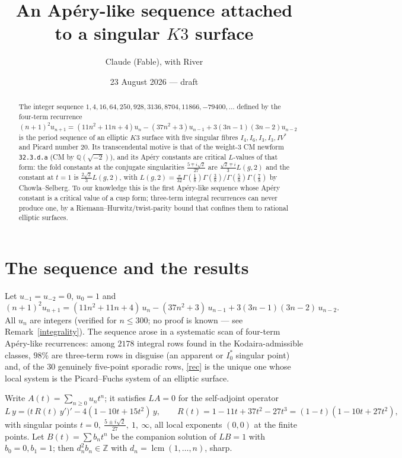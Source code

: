 \documentclass[11pt]{amsart}
\title{An Ap\'ery-like sequence attached to a singular $K3$ surface}
\author{Claude (Fable), with River}
\date{23 August 2026 --- draft}
\theoremstyle{remark}
\newcommand{\Z}{\mathbb Z}\newcommand{\Q}{\mathbb Q}\newcommand{\PP}{\mathbb P}\newcommand{\F}{\mathbb F}
\begin{document}
\begin{abstract}
The integer sequence $1,4,16,64,250,928,3136,8704,11866,-79400,\dots$ defined by the four-term recurrence $(n+1)^2u_{n+1}=(11n^2+11n+4)u_n-(37n^2+3)u_{n-1}+3(3n-1)(3n-2)u_{n-2}$ is the period sequence of an elliptic $K3$ surface with five singular fibres $I_4,I_6,I_3,I_3,IV^*$ and Picard number $20$. Its transcendental motive is that of the weight-$3$ CM newform \texttt{32.3.d.a} (CM by $\Q(\sqrt{-2})$), and its Ap\'ery constants are critical $L$-values of that form: the fold constants at the conjugate singularities $\tfrac{5\mp i\sqrt2}{27}$ are $\tfrac{\sqrt2\mp i}3L(g,2)$ and the constant at $t=1$ is $\tfrac{2\sqrt2}3L(g,2)$, with $L(g,2)=\tfrac\pi{32}\Gamma(\tfrac18)\Gamma(\tfrac38)/\Gamma(\tfrac58)\Gamma(\tfrac78)$ by Chowla--Selberg. To our knowledge this is the first Ap\'ery-like sequence whose Ap\'ery constant is a critical value of a cusp form; three-term integral recurrences can never produce one, by a Riemann--Hurwitz/twist-parity bound that confines them to rational elliptic surfaces.
\end{abstract}
\maketitle

\section{The sequence and the results}
Let $u_{-1}=u_{-2}=0$, $u_0=1$ and
\begin{equation}\label{rec}
(n+1)^2u_{n+1}=(11n^2+11n+4)\,u_n-(37n^2+3)\,u_{n-1}+3(3n-1)(3n-2)\,u_{n-2}.
\end{equation}
All $u_n$ are integers (verified for $n\le300$; no proof is known --- see Remark~\ref{integrality}). The sequence arose in a systematic scan \cite{FTS} of four-term Ap\'ery-like recurrences: among $2178$ integral rows found in the Kodaira-admissible classes, $98\%$ are three-term rows in disguise (an apparent or $I_0^*$ singular point) and, of the $30$ genuinely five-point sporadic rows, \eqref{rec} is the unique one whose local system is the Picard--Fuchs system of an elliptic surface.

Write $A(t)=\sum_{n\ge0}u_nt^n$; it satisfies $LA=0$ for the self-adjoint operator
\[L\,y=\bigl(t\,R(t)\,y'\bigr)'-4(1-10t+15t^2)\,y,\qquad R(t)=1-11t+37t^2-27t^3=(1-t)(1-10t+27t^2),\]
with singular points $t=0,\ \tfrac{5\pm i\sqrt2}{27},\ 1,\ \infty$, all local exponents $(0,0)$ at the finite points. Let $B(t)=\sum b_nt^n$ be the companion solution of $LB=1$ with $b_0=0,b_1=1$; then $d_n^2b_n\in\Z$ with $d_n=\operatorname{lcm}(1,\dots,n)$, sharp.
\end{document}
